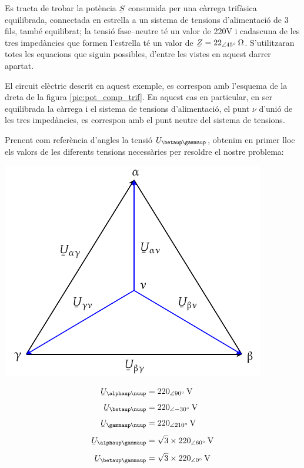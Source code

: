\begin{exemple}
    Es tracta de trobar la pot\`{e}ncia $\cmplx{S}$ consumida per una c\`{a}rrega
    trif\`{a}sica equilibrada, connectada en estrella a un sistema de tensions
    d'alimentaci\'{o}  de 3 fils, tamb\'{e} equilibrat; la tensi\'{o} fase--neutre
    t\'{e} un valor de 220\unit{V} i cadascuna de les tres  imped\`{a}ncies
    que formen l'estrella t\'{e} un valor de $\cmplx{Z}=22_{\angle
    45\degree}\unit{\ohm}$. S'utilitzaran totes les equacions que
    siguin possibles, d'entre les vistes en aquest darrer apartat.

    El circuit el\`{e}ctric descrit en aquest exemple, es correspon amb
    l'esquema de la dreta de la figura \vref{pic:pot_comp_trif}. En
    aquest cas en particular, en ser equilibrada la c\`{a}rrega i el
    sistema de tensions d'alimentaci\'{o}, el punt $\nu$ d'uni\'{o} de  les tres imped\`{a}ncies, es
    correspon amb el punt neutre del sistema de tensions.

    Prenent com refer\`{e}ncia d'angles la tensi\'{o}
    $\cmplx{U}_{\betaup\gammaup}$, obtenim en primer lloc els valors de
    les diferents tensions necess\`{a}ries per resoldre el nostre
    problema:

    \hfill
    \begin{minipage}[b]{7.5cm}
        \includegraphics{Imatges/Cap-Fonaments-Potencia-Exemple.pdf}
    \end{minipage}
    \hfill
    \begin{minipage}[b][5.7cm][t]{3.8cm}
    \begin{align*}
        \cmplx{U}_{\alphaup\nuup} &= 220_{\angle 90\degree}\unit{V} \\[1ex]
        \cmplx{U}_{\betaup\nuup} &= 220_{\angle -30\degree}\unit{V} \\[1ex]
        \cmplx{U}_{\gammaup\nuup} &= 220_{\angle 210\degree}\unit{V} \\[1ex]
        \cmplx{U}_{\alphaup\gammaup} &= \sqrt{3}\times 220_{\angle 60\degree}\unit{V} \\[1ex]
        \cmplx{U}_{\betaup\gammaup} &= \sqrt{3}\times 220_{\angle 0\degree}\unit{V}
    \end{align*}
    \end{minipage}
    \hfill{}


\end{exemple}

